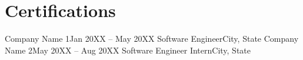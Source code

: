 \section{Certifications}
\resumeSubHeadingListStart

    \resumeSubheading
    {Company Name 1}{Jan 20XX -- May 20XX}
    {Software Engineer}{City, State}
    \resumeSubheading
    {Company Name 2}{May 20XX -- Aug 20XX}
    {Software Engineer Intern}{City, State}
\resumeSubHeadingListEnd